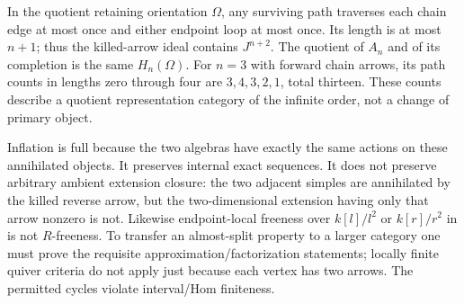 \documentclass[11pt]{article}
\theoremstyle{definition}\newtheorem{definition}[theorem]{Definition}
\theoremstyle{remark}\newtheorem{remark}[theorem]{Remark}
\begin{document}
In the quotient retaining orientation $\Omega$, any surviving path traverses each chain edge at most once and either endpoint loop at most once. Its length is at most $n+1$; thus the killed-arrow ideal contains $J^{n+2}$. The quotient of $A_n$ and of its completion is the same $H_n(\Omega)$. For $n=3$ with forward chain arrows, its path counts in lengths zero through four are $3,4,3,2,1$, total thirteen. These counts describe a quotient representation category of the infinite order, not a change of primary object.

Inflation is full because the two algebras have exactly the same actions on these annihilated objects. It preserves internal exact sequences. It does not preserve arbitrary ambient extension closure: the two adjacent simples are annihilated by the killed reverse arrow, but the two-dimensional extension having only that arrow nonzero is not. Likewise endpoint-local freeness over $k[l]/l^2$ or $k[r]/r^2$ in \cite{HuangLinSu} is not $R$-freeness. To transfer an almost-split property to a larger category one must prove the requisite approximation/factorization statements; locally finite quiver criteria \cite{BautistaLiuPaquette,Paquette,LiuNgPaquette} do not apply just because each vertex has two arrows. The permitted cycles violate interval/Hom finiteness.
\end{document}
